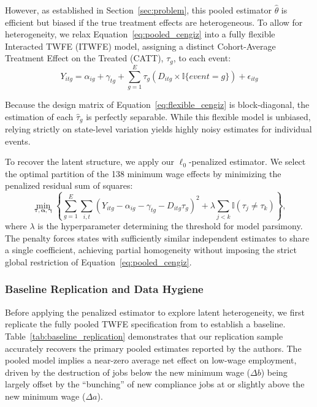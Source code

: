 \documentclass[margin=5in, 12pt]{article}
\newcommand{\1}{\mathbbm{1}}
\begin{document}
However, as established in Section~\ref{sec:problem}, this pooled estimator $\hat{\theta}$ is efficient but biased if the true treatment effects are heterogeneous. To allow for heterogeneity, we relax Equation~\ref{eq:pooled_cengiz} into a fully flexible Interacted TWFE (ITWFE) model, assigning a distinct Cohort-Average Treatment Effect on the Treated (CATT), $\tau_g$, to each event:
\begin{equation} \label{eq:flexible_cengiz}
    Y_{itg} = \alpha_{ig} + \gamma_{tg} + \sum_{g=1}^{E} \tau_g \left( D_{itg} \times \mathbb{I}\{event = g\} \right) + \epsilon_{itg}
\end{equation}

Because the design matrix of Equation~\ref{eq:flexible_cengiz} is block-diagonal, the estimation of each $\hat{\tau}_g$ is perfectly separable. While this flexible model is unbiased, relying strictly on state-level variation yields highly noisy estimates for individual events.

To recover the latent structure, we apply our $\ell_0$-penalized estimator. We select the optimal partition of the 138 minimum wage effects by minimizing the penalized residual sum of squares:
\begin{equation} \label{eq:penalized_cengiz}
    \min_{\boldsymbol{\tau}, \boldsymbol{\alpha}, \boldsymbol{\gamma}} \left\{ \sum_{g=1}^{E} \sum_{i,t} \left( Y_{itg} - \alpha_{ig} - \gamma_{tg} - D_{itg} \tau_g \right)^2 + \lambda \sum_{j < k} \mathbb{I}(\tau_j \neq \tau_k) \right\},
\end{equation}
where $\lambda$ is the hyperparameter determining the threshold for model parsimony. The penalty forces states with sufficiently similar independent estimates to share a single coefficient, achieving partial homogeneity without imposing the strict global restriction of Equation~\ref{eq:pooled_cengiz}.

\subsubsection{Baseline Replication and Data Hygiene}

Before applying the penalized estimator to explore latent heterogeneity, we first replicate the fully pooled TWFE specification from \citet{cengiz2019} to establish a baseline. Table~\ref{tab:baseline_replication} demonstrates that our replication sample accurately recovers the primary pooled estimates reported by the authors. The pooled model implies a near-zero average net effect on low-wage employment, driven by the destruction of jobs below the new minimum wage ($\Delta b$) being largely offset by the ``bunching'' of new compliance jobs at or slightly above the new minimum wage ($\Delta a$).
\end{document}
